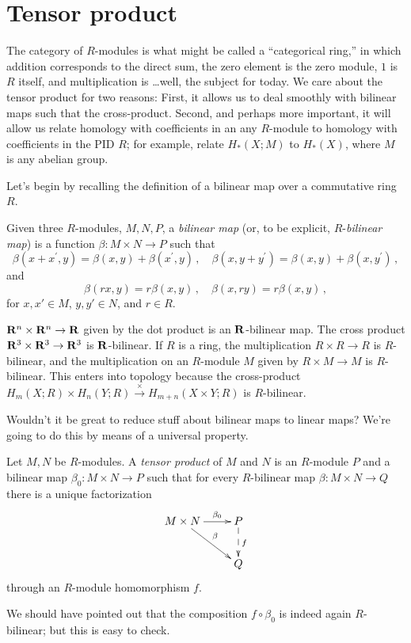 \section{Tensor product}

The category of $R$-modules is what might be called a ``categorical ring,'' in which addition corresponds to the direct sum, the zero element is the zero module, $1$ is $R$ itself, and multiplication is \ldots well, the subject for today. We care about the tensor product for two reasons: 
First, it allows us to deal smoothly with bilinear maps such that 
the cross-product. Second, and perhaps more important, it will allow us relate homology
with coefficients in an any $R$-module to homology with coefficients in the 
PID $R$; for example, relate $H_*(X;M)$ to $H_*(X)$, where $M$ is any
abelian group.

Let's begin by recalling the definition of a bilinear map over a commutative ring $R$.
\begin{definition}
Given three $R$-modules, $M,N,P$, a {\em bilinear map} (or, to be explicit, $R$-{\em bilinear map}) is a function $\beta:M\times N\to P$ such that
\[
\beta(x+x^\prime,y)=\beta(x,y)+\beta(x^\prime,y)\,,\quad
\beta(x,y+y^\prime)=\beta(x,y)+\beta(x,y^\prime)\,,
\]
and
\[
\beta(rx,y)=r\beta(x,y)\,,\quad\beta(x,ry)=r\beta(x,y)\,,
\]
for $x,x'\in M$, $y,y'\in N$, and $r\in R$.
\end{definition}

\begin{example}
$\mathbf R^n\times\mathbf R^n\to\mathbf R$ given by the dot product is an $\mathbf R$-bilinear map. The cross product $\mathbf R^3\times\mathbf R^3\to\mathbf R^3$ is $\mathbf R$-bilinear. If $R$ is a ring, the multiplication $R\times R\to R$ is $R$-bilinear, and the multiplication on an $R$-module $M$ given by $R\times M\to M$ is $R$-bilinear. This enters into topology because the cross-product $ H_m(X;R)\times H_n(Y;R)\xrightarrow{\times} H_{m+n}(X\times Y;R)$ is $R$-bilinear.
\end{example}
Wouldn't it be great to reduce stuff about bilinear maps to linear maps? We're going to do this by means of a universal property.
\begin{definition}
Let $M,N$ be $R$-modules. A \emph{tensor product} of $M$ and $N$ is an $R$-module $P$ and a bilinear map $\beta_0:M\times N\rightarrow P$ such that for every $R$-bilinear map $\beta:M\times N\rightarrow Q$ there is a unique factorization
\begin{equation*}
\xymatrix{M\times N\ar[r]^-{\beta_0}\ar[dr]^\beta & P\ar@{-->}[d]^f\\
 & Q}
\end{equation*}
through an $R$-module homomorphism $f$. 
\end{definition}
We should have pointed out that the composition $f\circ\beta_0$ is indeed 
again $R$-bilinear; but this is easy to check.

